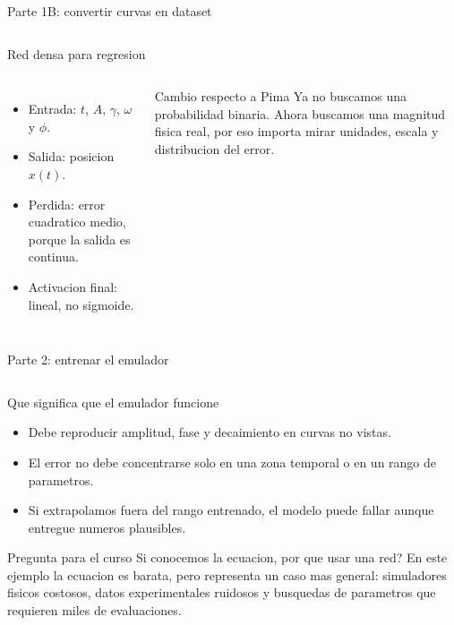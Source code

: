 \begin{frame}[fragile]{Parte 1B: convertir curvas en dataset}
\inputminted[firstline=24,lastline=44]{python}{codes/clase1-p1.py}
\end{frame}

\begin{frame}{Red densa para regresion}
\begin{columns}[T,onlytextwidth]
\begin{itemize}
    \item Entrada: $t$, $A$, $\gamma$, $\omega$ y $\phi$.
    \item Salida: posicion $x(t)$.
    \item Perdida: error cuadratico medio, porque la salida es continua.
    \item Activacion final: lineal, no sigmoide.
\end{itemize}
\begin{alertblock}{Cambio respecto a Pima}
Ya no buscamos una probabilidad binaria. Ahora buscamos una magnitud fisica real, por eso importa mirar unidades, escala y distribucion del error.
\end{alertblock}
\centering
\resizebox{0.98\linewidth}{!}{}
\end{columns}
\end{frame}

\begin{frame}[fragile]{Parte 2: entrenar el emulador}
\inputminted{python}{codes/clase1-p2.py}
\end{frame}

\begin{frame}{Que significa que el emulador funcione}
\begin{itemize}
    \item Debe reproducir amplitud, fase y decaimiento en curvas no vistas.
    \item El error no debe concentrarse solo en una zona temporal o en un rango de parametros.
    \item Si extrapolamos fuera del rango entrenado, el modelo puede fallar aunque entregue numeros plausibles.
\end{itemize}

\begin{block}{Pregunta para el curso}
Si conocemos la ecuacion, por que usar una red? En este ejemplo la ecuacion es barata, pero representa un caso mas general: simuladores fisicos costosos, datos experimentales ruidosos y busquedas de parametros que requieren miles de evaluaciones.
\end{block}
\end{frame}

